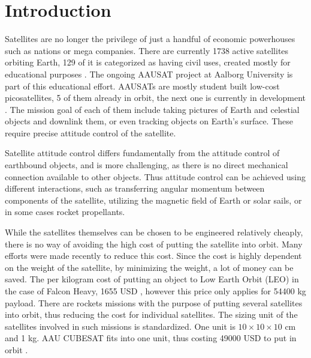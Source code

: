 \chapter{Introduction}\label{chap:Introduction}

Satellites are no longer the privilege of just a handful of economic powerhouses such as nations or mega companies. There are currently 1738 active satellites orbiting Earth, 129 of it is categorized as having civil uses, created mostly for educational purposes \cite{SatSummary}. The ongoing AAUSAT project at Aalborg University is part of this educational effort. AAUSATs are mostly student built low-cost picosatellites, 5 of them already in orbit, the next one is currently in development \cite{aausatsite}. 
 The mission goal of each of them include taking pictures of Earth and celestial objects and downlink them, or even tracking objects on Earth's surface. These require precise attitude control of the satellite. 

Satellite attitude control differs fundamentally from the attitude control of earthbound objects, and is more challenging, as there is no direct mechanical connection available to other objects. Thus attitude control can be achieved using different interactions, such as transferring angular momentum between components of the satellite, utilizing the magnetic field of Earth or solar sails, or in some cases rocket propellants.

 While the satellites themselves can be chosen to be engineered relatively cheaply, there is no way of avoiding the high cost of putting the satellite into orbit. Many efforts were made recently to reduce this cost.  Since the cost is highly dependent on the weight of the satellite, by minimizing the weight, a lot of money can be saved. The per kilogram cost of putting an object to Low Earth Orbit (LEO) in the case of Falcon Heavy, 1655 USD \cite{spaceX}, however this price only applies for 54400 kg payload. There are rockets missions with the purpose of putting several satellites into orbit, thus reducing the cost for individual satellites. The sizing unit of the satellites involved in such missions is standardized. One unit is $10\times10\times10$ cm and 1 kg. AAU CUBESAT fits into one unit, thus costing 49000 USD to put in orbit \cite{AAUSATpres}. 
 
